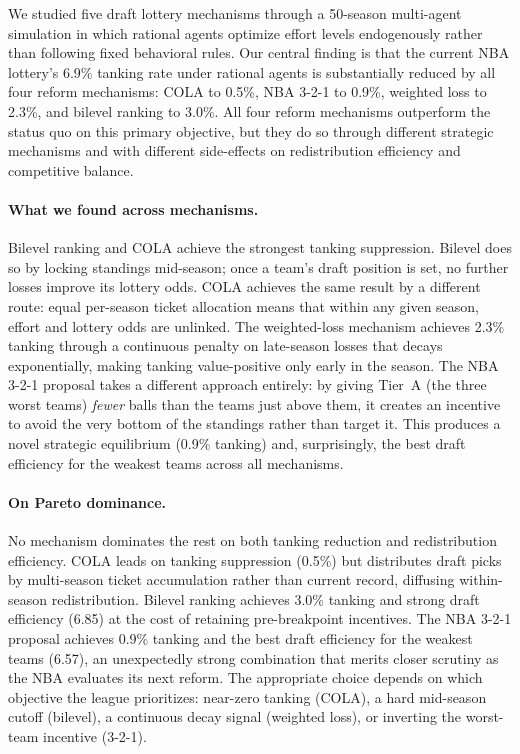 \documentclass{article}
\begin{document}
We studied five draft lottery mechanisms through a 50-season multi-agent
simulation in which rational agents optimize effort levels endogenously
rather than following fixed behavioral rules.
Our central finding is that the current NBA lottery's 6.9\% tanking rate
under rational agents is substantially reduced by all four reform mechanisms:
COLA to 0.5\%, NBA 3-2-1 to 0.9\%, weighted loss to 2.3\%, and bilevel
ranking to 3.0\%.
All four reform mechanisms outperform the status quo on this primary objective,
but they do so through different strategic mechanisms and with different
side-effects on redistribution efficiency and competitive balance.

\paragraph{What we found across mechanisms.}
Bilevel ranking and COLA achieve the strongest tanking suppression.
Bilevel does so by locking standings mid-season; once a team's draft position
is set, no further losses improve its lottery odds.
COLA achieves the same result by a different route: equal per-season ticket
allocation means that within any given season, effort and lottery odds are
unlinked.
The weighted-loss mechanism achieves 2.3\% tanking through a continuous
penalty on late-season losses that decays exponentially, making tanking
value-positive only early in the season.
The NBA 3-2-1 proposal takes a different approach entirely: by giving Tier~A
(the three worst teams) \emph{fewer} balls than the teams just above them,
it creates an incentive to avoid the very bottom of the standings rather than
target it.
This produces a novel strategic equilibrium (0.9\% tanking) and, surprisingly,
the best draft efficiency for the weakest teams across all mechanisms.

\paragraph{On Pareto dominance.}
No mechanism dominates the rest on both tanking reduction and redistribution
efficiency.
COLA leads on tanking suppression (0.5\%) but distributes draft picks by
multi-season ticket accumulation rather than current record, diffusing
within-season redistribution.
Bilevel ranking achieves 3.0\% tanking and strong draft efficiency (6.85)
at the cost of retaining pre-breakpoint incentives.
The NBA 3-2-1 proposal achieves 0.9\% tanking and the best draft efficiency
for the weakest teams (6.57), an unexpectedly strong combination that merits
closer scrutiny as the NBA evaluates its next reform.
The appropriate choice depends on which objective the league prioritizes:
near-zero tanking (COLA), a hard mid-season cutoff (bilevel), a continuous
decay signal (weighted loss), or inverting the worst-team incentive (3-2-1).
\end{document}
